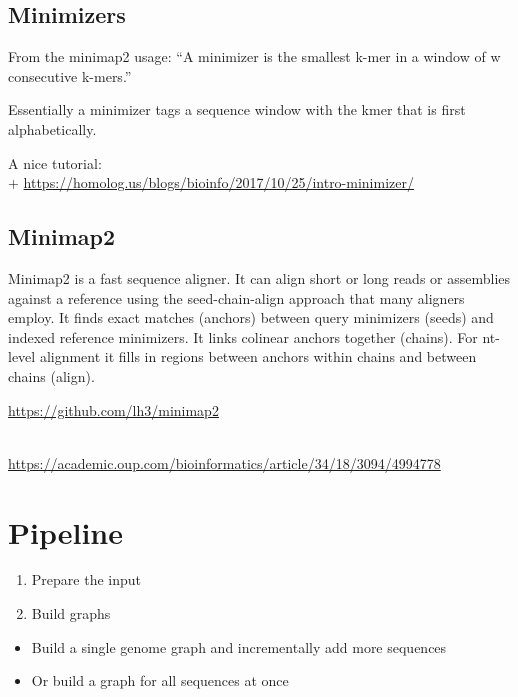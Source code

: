 \documentclass[
]{book}
\providecommand{\tightlist}{%
  \setlength{\itemsep}{0pt}\setlength{\parskip}{0pt}}
\begin{document}
\hypertarget{minimizers}{%
\subsection*{Minimizers}\label{minimizers}}

From the minimap2 usage:
``A minimizer is the smallest k-mer in a window of w consecutive k-mers.''

Essentially a minimizer tags a sequence window with the kmer that is first alphabetically.

A nice tutorial:\\
+ \url{https://homolog.us/blogs/bioinfo/2017/10/25/intro-minimizer/}

\hypertarget{minimap2}{%
\subsection*{Minimap2}\label{minimap2}}

Minimap2 is a fast sequence aligner.
It can align short or long reads or assemblies against a reference using the seed-chain-align approach that many aligners employ. It finds exact matches (anchors) between query minimizers (seeds) and indexed reference minimizers. It links colinear anchors together (chains). For nt-level alignment it fills in regions between anchors within chains and between chains (align).

\url{https://github.com/lh3/minimap2}\strut \\
\url{https://academic.oup.com/bioinformatics/article/34/18/3094/4994778}

\hypertarget{pipeline-1}{%
\section{Pipeline}\label{pipeline-1}}

\begin{enumerate}
\def\labelenumi{\arabic{enumi}.}
\tightlist
\item
  Prepare the input
\item
  Build graphs
\end{enumerate}

\begin{itemize}
\tightlist
\item
  Build a single genome graph and incrementally add more sequences
\item
  Or build a graph for all sequences at once
\end{itemize}
\end{document}
